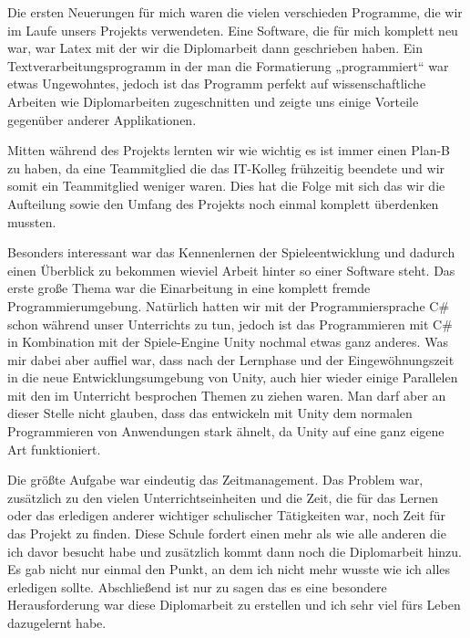 Die ersten Neuerungen für mich waren die vielen verschieden Programme, die wir im Laufe unsers Projekts verwendeten. Eine Software, die für mich komplett neu war, war Latex mit der wir die Diplomarbeit dann geschrieben haben. Ein Textverarbeitungsprogramm in der man die Formatierung „programmiert“ war etwas Ungewohntes, jedoch ist das Programm perfekt auf wissenschaftliche Arbeiten wie Diplomarbeiten zugeschnitten und zeigte uns einige Vorteile gegenüber anderer Applikationen.  

Mitten während des Projekts lernten wir wie wichtig es ist immer einen Plan-B zu haben, da eine Teammitglied die das IT-Kolleg frühzeitig beendete und wir somit ein Teammitglied weniger waren. Dies hat die Folge mit sich das wir die Aufteilung sowie den Umfang des Projekts noch einmal komplett überdenken mussten. 

Besonders interessant war das Kennenlernen der Spieleentwicklung und dadurch einen Überblick zu bekommen wieviel Arbeit hinter so einer Software steht. Das erste große Thema war die Einarbeitung in eine komplett fremde Programmierumgebung. Natürlich hatten wir mit der Programmiersprache C\# schon während unser Unterrichts zu tun, jedoch ist das Programmieren mit C\# in Kombination mit der Spiele-Engine Unity nochmal etwas ganz anderes. Was mir dabei aber auffiel war, dass nach der Lernphase und der Eingewöhnungszeit in die neue Entwicklungsumgebung von Unity, auch hier wieder einige Parallelen mit den im Unterricht besprochen Themen zu ziehen waren. Man darf aber an dieser Stelle nicht glauben, dass das entwickeln mit Unity dem normalen Programmieren von Anwendungen stark ähnelt, da Unity auf eine ganz eigene Art funktioniert.

Die größte Aufgabe war eindeutig das Zeitmanagement. Das Problem war, zusätzlich zu den vielen Unterrichtseinheiten und die Zeit, die für das Lernen oder das erledigen anderer wichtiger schulischer Tätigkeiten war, noch Zeit für das Projekt zu finden. Diese Schule fordert einen mehr als wie alle anderen die ich davor besucht habe und zusätzlich kommt dann noch die Diplomarbeit hinzu. Es gab nicht nur einmal den Punkt, an dem ich nicht mehr wusste wie ich alles erledigen sollte. 
Abschließend ist nur zu sagen das es eine besondere Herausforderung war diese Diplomarbeit zu erstellen und ich sehr viel fürs Leben dazugelernt habe.

